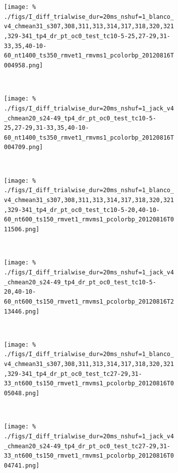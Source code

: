 \begin{figure}[htbp]
    \begin{subfigure}[b]{0.5\linewidth}
        \centering
        \caption{}
        \label{fig:b4-alldif}
        \texttt{[image: \%
./figs/I\_diff\_trialwise\_dur=20ms\_nshuf=1\_blanco\_v4\_chmean31\_s307,308,311,313,314,317,318,320,321,329-341\_tp4\_dr\_pt\_oc0\_test\_tc10-5-25,27-29,31-33,35,40-10-60\_nt1400\_ts350\_rmvet1\_rmvms1\_pcolorbp\_20120816T004958.png]}
    \end{subfigure}
    ~~
    \begin{subfigure}[b]{0.5\linewidth}
        \centering
        \caption{}
        \label{fig:j4-alldif}
        \texttt{[image: \%
./figs/I\_diff\_trialwise\_dur=20ms\_nshuf=1\_jack\_v4\_chmean20\_s24-49\_tp4\_dr\_pt\_oc0\_test\_tc10-5-25,27-29,31-33,35,40-10-60\_nt1400\_ts350\_rmvet1\_rmvms1\_pcolorbp\_20120816T004709.png]}
    \end{subfigure}
    \\
    \begin{subfigure}[b]{0.5\linewidth}
        \centering
        \caption{}
        \label{fig:b4-cdif}
        \texttt{[image: \%
./figs/I\_diff\_trialwise\_dur=20ms\_nshuf=1\_blanco\_v4\_chmean31\_s307,308,311,313,314,317,318,320,321,329-341\_tp4\_dr\_pt\_oc0\_test\_tc10-5-20,40-10-60\_nt600\_ts150\_rmvet1\_rmvms1\_pcolorbp\_20120816T011506.png]}
    \end{subfigure}
    ~~
    \begin{subfigure}[b]{0.5\linewidth}
        \centering
        \caption{}
        \label{fig:j4-cdif}
        \texttt{[image: \%
./figs/I\_diff\_trialwise\_dur=20ms\_nshuf=1\_jack\_v4\_chmean20\_s24-49\_tp4\_dr\_pt\_oc0\_test\_tc10-5-20,40-10-60\_nt600\_ts150\_rmvet1\_rmvms1\_pcolorbp\_20120816T213446.png]}
    \end{subfigure}
    \\
    \begin{subfigure}[b]{0.5\linewidth}
        \centering
        \caption{}
        \label{fig:b4-fdif}
        \texttt{[image: \%
./figs/I\_diff\_trialwise\_dur=20ms\_nshuf=1\_blanco\_v4\_chmean31\_s307,308,311,313,314,317,318,320,321,329-341\_tp4\_dr\_pt\_oc0\_test\_tc27-29,31-33\_nt600\_ts150\_rmvet1\_rmvms1\_pcolorbp\_20120816T005048.png]}
    \end{subfigure}
    ~~
    \begin{subfigure}[b]{0.5\linewidth}
        \centering
        \caption{}
        \label{fig:j4-fdif}
        \texttt{[image: \%
./figs/I\_diff\_trialwise\_dur=20ms\_nshuf=1\_jack\_v4\_chmean20\_s24-49\_tp4\_dr\_pt\_oc0\_test\_tc27-29,31-33\_nt600\_ts150\_rmvet1\_rmvms1\_pcolorbp\_20120816T004741.png]}

\end{subfigure}
\end{figure}
